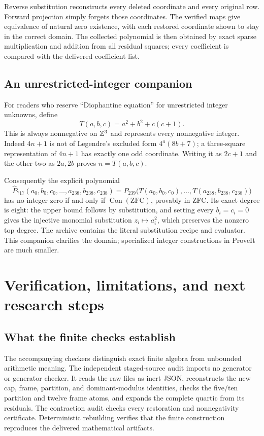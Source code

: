 \documentclass[11pt]{article}
\theoremstyle{definition}\newtheorem{definition}[theorem]{Definition}
\theoremstyle{remark}\newtheorem{remark}[theorem]{Remark}
\newcommand{\Con}{\operatorname{Con}}\newcommand{\Refut}{\operatorname{Refut}}
\begin{document}
Reverse substitution reconstructs every deleted coordinate and every original row. Forward projection simply forgets those coordinates. The verified maps give equivalence of natural zero existence, with each restored coordinate shown to stay in the correct domain. The collected polynomial is then obtained by exact sparse multiplication and addition from all residual squares; every coefficient is compared with the delivered coefficient list.

\subsection{An unrestricted-integer companion}

For readers who reserve ``Diophantine equation'' for unrestricted integer unknowns, define
\[
 T(a,b,c)=a^2+b^2+c(c+1).
\]
This is always nonnegative on $\mathbb Z^3$ and represents every nonnegative integer. Indeed $4n+1$ is not of Legendre's excluded form $4^a(8b+7)$; a three-square representation of $4n+1$ has exactly one odd coordinate. Writing it as $2c+1$ and the other two as $2a,2b$ proves $n=T(a,b,c)$.

Consequently the explicit polynomial
\begin{equation}\label{eq:integercompanion}
 \widehat P_{717}(a_0,b_0,c_0,\ldots,a_{238},b_{238},c_{238})
 =P_{239}\bigl(T(a_0,b_0,c_0),\ldots,T(a_{238},b_{238},c_{238})\bigr)
\end{equation}
has no integer zero if and only if $\Con(\mathrm{ZFC})$, provably in ZFC. Its exact degree is eight: the upper bound follows by substitution, and setting every $b_i=c_i=0$ gives the injective monomial substitution $z_i\mapsto a_i^2$, which preserves the nonzero top degree. The archive contains the literal substitution recipe and evaluator. This companion clarifies the domain; specialized integer constructions in ProveIt are much smaller.



\section{Verification, limitations, and next research steps}

\subsection{What the finite checks establish}

The accompanying checkers distinguish exact finite algebra from unbounded arithmetic meaning. The independent staged-source audit imports no generator or generator checker. It reads the raw files as inert JSON, reconstructs the new cap, frame, partition, and dominant-modulus identities, checks the five/ten partition and twelve frame atoms, and expands the complete quartic from its residuals. The contraction audit checks every restoration and nonnegativity certificate. Deterministic rebuilding verifies that the finite construction reproduces the delivered mathematical artifacts.
\end{document}
